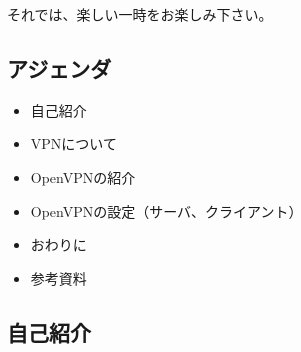 \documentclass[mingoth,a4paper]{jsarticle}
\begin{document}
 それでは、楽しい一時をお楽しみ下さい。
 



\subsection{アジェンダ}

\begin{itemize}
\item 自己紹介
\item VPNについて
\item OpenVPNの紹介
\item OpenVPNの設定（サーバ、クライアント）
\item おわりに
\item 参考資料
\end{itemize}


\subsection{自己紹介}
\end{document}
